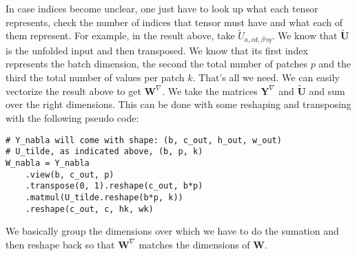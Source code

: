 \documentclass{article}
\begin{document}
\noindent In case indices become unclear, one just have to look up what each tensor represents, check the number of indices that tensor must have and what each of them represent. For example, in the result above, take \(\tilde{U}_{a,cd,\beta\gamma\eta}\). We know that \(\tilde{\mathbf{U}}\) is the unfolded input and then transposed. We know that its first index represents the batch dimension, the second the total number of patches \(p\) and the third the total number of values per patch \(k\). That's all we need. We can easily vectorize the result above to get \(\mathbf{W}^\nabla\). We take the matrices \(\mathbf{Y}^\nabla\) and \(\mathbf{\tilde{U}}\) and sum over the right dimensions. This can be done with some reshaping and transposing with the following pseudo code:

\begin{verbatim}
# Y_nabla will come with shape: (b, c_out, h_out, w_out)
# U_tilde, as indicated above, (b, p, k)
W_nabla = Y_nabla
    .view(b, c_out, p)
    .transpose(0, 1).reshape(c_out, b*p)
    .matmul(U_tilde.reshape(b*p, k))
    .reshape(c_out, c, hk, wk)
\end{verbatim}

\noindent We basically group the dimensions over which we have to do the sumation and then reshape back so that \(\mathbf{W}^\nabla\) matches the dimensions of \(\mathbf{W}\).
\end{document}
